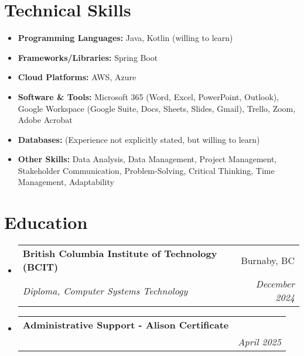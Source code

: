 \documentclass[letterpaper,11pt]{article}
\makeatletter
\newcommand{\resumeSubheading}[4]{
\vspace{-2pt}\item
\begin{tabular*}{0.97\textwidth}[t]{l@{\extracolsep{\fill}}r}
\textbf{#1} & #2 \\
\textit{\small#3} & \textit{\small #4} \\
\end{tabular*}\vspace{-7pt}
}
\newcommand{\resumeSubHeadingListStart}{\begin{itemize}[leftmargin=0.15in, label={}]}
\newcommand{\resumeSubHeadingListEnd}{\end{itemize}}
\makeatother
\begin{document}
\section{Technical Skills}
\begin{itemize}[leftmargin=0.15in, label={}]
\item{\textbf{Programming Languages:} Java, Kotlin (willing to learn)}
\item{\textbf{Frameworks/Libraries:} Spring Boot}
\item{\textbf{Cloud Platforms:} AWS, Azure}
\item{\textbf{Software \& Tools:} Microsoft 365 (Word, Excel, PowerPoint, Outlook), Google Workspace (Google Suite, Docs, Sheets, Slides, Gmail), Trello, Zoom, Adobe Acrobat}
\item{\textbf{Databases:} (Experience not explicitly stated, but willing to learn)}
\item{\textbf{Other Skills:} Data Analysis, Data Management, Project Management, Stakeholder Communication, Problem-Solving, Critical Thinking, Time Management, Adaptability}
\end{itemize}

\section{Education}
\resumeSubHeadingListStart
\resumeSubheading{British Columbia Institute of Technology (BCIT)}{Burnaby, BC}{Diploma, Computer Systems Technology}{December 2024}
\resumeSubheading{Administrative Support - Alison Certificate}{}{}{April 2025}
\resumeSubHeadingListEnd
\end{document}
